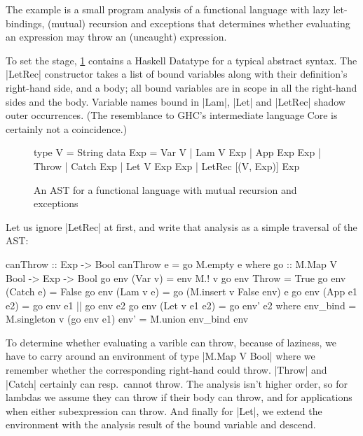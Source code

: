 \documentclass[manuscript,anonymous,screen,acmsmall]{acmart}
\begin{document}
The example is a small program analysis of a functional language with lazy let-bindings, (mutual) recursion and exceptions that determines whether evaluating an expression may throw an (uncaught) expression.

To set the stage, \cref{fig:analast} contains a Haskell Datatype for a typical abstract syntax. The |LetRec| constructor takes a list of bound variables along with their definition's  right-hand side, and a body; all bound variables are in scope in all the right-hand sides and the body.
Variable names bound in |Lam|, |Let| and |LetRec| shadow outer occurrences. (The resemblance to GHC's intermediate language Core \citep{secrets} is certainly not a coincidence.)

\begin{figure}
\setlength{\abovedisplayskip}{0pt}%
\setlength{\belowdisplayskip}{0pt}%
\begin{code}
type V    =  String
data Exp  =  Var V | Lam V Exp | App Exp Exp | Throw | Catch Exp
          |  Let V Exp Exp | LetRec [(V, Exp)] Exp
\end{code}
\caption{An AST for a functional language with mutual recursion and exceptions}
\label{fig:analast}
\end{figure}

Let us ignore |LetRec| at first, and write that analysis as a simple traversal of the AST:
\savecolumns
\begin{code}
canThrow :: Exp -> Bool
canThrow e = go M.empty e
  where
    go :: M.Map V Bool -> Exp -> Bool
    go env (Var v)        = env M.! v
    go env Throw          = True
    go env (Catch e)      = False
    go env (Lam v e)      = go (M.insert v False env) e
    go env (App e1 e2)    = go env e1 || go env e2
    go env (Let v e1 e2)  = go env' e2
      where
        env_bind  = M.singleton v (go env e1)
        env'      = M.union env_bind env
\end{code}

To determine whether evaluating a varible can throw, because of laziness, we have to carry around an
environment of type |M.Map V Bool| where we remember whether the corresponding right-hand could throw. |Throw| and |Catch| certainly can resp.\ cannot throw. The analysis isn't higher order, so for lambdas we assume they can throw if their body can throw, and for applications when either subexpression can throw. And finally for |Let|, we extend the environment with the analysis result of the bound variable and descend.
\end{document}
